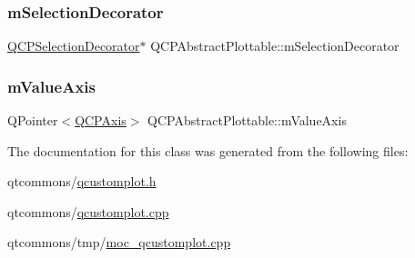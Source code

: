 \mbox{\label{class_q_c_p_abstract_plottable_a0dbc731cab717f4ff67b4ca100c74046}} 
\subsubsection{\texorpdfstring{mSelectionDecorator}{mSelectionDecorator}}
{\footnotesize\ttfamily \mbox{\hyperlink{class_q_c_p_selection_decorator}{Q\+C\+P\+Selection\+Decorator}}$\ast$ Q\+C\+P\+Abstract\+Plottable\+::m\+Selection\+Decorator\hspace{0.3cm}{\ttfamily [protected]}}

\mbox{\label{class_q_c_p_abstract_plottable_a2901452ca4aea911a1827717934a4bda}} 
\subsubsection{\texorpdfstring{mValueAxis}{mValueAxis}}
{\footnotesize\ttfamily Q\+Pointer$<$\mbox{\hyperlink{class_q_c_p_axis}{Q\+C\+P\+Axis}}$>$ Q\+C\+P\+Abstract\+Plottable\+::m\+Value\+Axis\hspace{0.3cm}{\ttfamily [protected]}}



The documentation for this class was generated from the following files\+:\begin{DoxyCompactItemize}
\item 
qtcommons/\mbox{\hyperlink{qcustomplot_8h}{qcustomplot.\+h}}\item 
qtcommons/\mbox{\hyperlink{qcustomplot_8cpp}{qcustomplot.\+cpp}}\item 
qtcommons/tmp/\mbox{\hyperlink{moc__qcustomplot_8cpp}{moc\+\_\+qcustomplot.\+cpp}}\end{DoxyCompactItemize}
